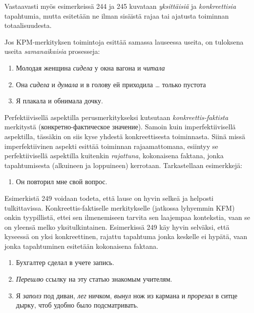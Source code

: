 \documentclass[]{scrartcl}
\providecommand{\tightlist}{%
  \setlength{\itemsep}{0pt}\setlength{\parskip}{0pt}}
\begin{document}
Vastaavasti myös esimerkeissä 244 ja 245 kuvataan \emph{yksittäisiä} ja
\emph{konkreettisia} tapahtumia, mutta esitetään ne ilman sisäistä rajaa
tai ajatusta toiminnan totaalisuudesta.

Jos KPM-merkityksen toimintoja esittää samassa lauseessa useita, on
tuloksena useita \emph{samanaikaisia} prosesseja:

\begin{enumerate}
\def\labelenumi{(\arabic{enumi})}
\setcounter{enumi}{245}
\tightlist
\item
  Молодая женщина \emph{сидела} у окна вагона и \emph{читала}
\item
  Она \emph{сидела} и \emph{думала} и в голову ей приходила \ldots{}
  только пустота
\item
  Я плакала и обнимала дочку.
\end{enumerate}

Perfektiivisellä aspektilla perusmerkitykseksi kutsutaan
\emph{konkreettis-faktista} merkitystä (конкретно-фактическое значение).
Samoin kuin imperfektiivisellä aspektilla, tässäkin on siis kyse yhdestä
konkreettisesta toiminnasta. Siinä missä imperfektiivinen aspekti
esittää toiminnan rajaamattomana, esiintyy se perfektiivisellä
aspektilla kuitenkin \emph{rajattuna}, kokonaisena faktana, jonka
tapahtumisesta (alkuineen ja loppuineen) kerrotaan. Tarkastellaan
esimerkkejä:

\begin{enumerate}
\def\labelenumi{(\arabic{enumi})}
\setcounter{enumi}{248}
\tightlist
\item
  Он повторил мне свой вопрос.
\end{enumerate}

Esimerkistä 249 voidaan todeta, että lause on hyvin selkeä ja helposti
tulkittavissa. Konkreettis-faktiselle merkitykselle (jatkossa lyhyemmin
KFM) onkin tyypillistä, ettei sen ilmenemiseen tarvita sen laajempaa
kontekstia, vaan se on yleensä melko yksitulkintainen. Esimerkissä 249
käy hyvin selväksi, että kyseessä on yksi konkreettinen, rajattu
tapahtuma jonka keskelle ei hypätä, vaan jonka tapahtuminen esitetään
kokonaisena faktana.

\begin{enumerate}
\def\labelenumi{(\arabic{enumi})}
\setcounter{enumi}{249}
\tightlist
\item
  Бухгалтер сделал в учете запись.
\item
  \emph{Перешлю} ссылку на эту статью знакомым учителям.
\item
  Я \emph{заполз} под диван, \emph{лег} ничком, \emph{вынул} нож из
  кармана и \emph{прорезал} в ситце дырку, чтоб удобно было
  подсматривать.
\end{enumerate}
\end{document}
